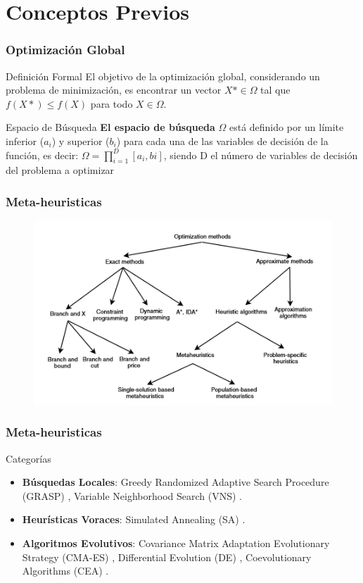
\section{Conceptos Previos}

\begin{frame}
    \frametitle{Optimización Global}
    \begin{block}{Definición Formal}
    El objetivo de la optimización global, considerando un problema de minimización, es encontrar un vector $X* \in \Omega$ tal que $f(X*) \leq f(X)$ para todo $X \in \Omega$.
    \end{block}
    \begin{block}{Espacio de Búsqueda}
    \textbf{El espacio de búsqueda} $\Omega$ está definido por un límite inferior ($a_{i}$) y superior ($b_{i}$) para cada una de las variables de decisión de la función, es decir: $\Omega = \prod^{D}_{i=1}[a_{i}, b{i}]$, siendo D el número de variables de decisión del problema a optimizar \cite{Segredo2017}
    \end{block}
\end{frame}

\begin{frame} %
\frametitle{Meta-heuristicas}
\begin{figure}
  \centering
	\includegraphics[scale=0.25]{img/meta}
\end{figure}
\end{frame}

\begin{frame}
\frametitle{Meta-heuristicas}
\begin{block}{Categorías}
\begin{itemize}
    \item \textbf{Búsquedas Locales}: Greedy Randomized Adaptive Search Procedure (GRASP) \cite{GRASP}, Variable Neighborhood Search (VNS) \cite{vns}.
    \item \textbf{Heurísticas Voraces}: Simulated Annealing (SA) \cite{SA}.
    \item \textbf{Algoritmos Evolutivos}: Covariance Matrix Adaptation Evolutionary Strategy (CMA-ES) \cite{CMA}, Differential Evolution (DE) \cite{DE1, DE2, DE3}, Coevolutionary Algorithms (CEA) \cite{COE1, COE2, COE3}.
\end{itemize}
\end{block}
\end{frame}

